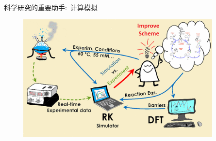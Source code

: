 \small
\begin{frame}{科学研究的重要助手:~计算模拟}
\begin{figure}[h!]
\vspace*{-0.18in}
\centering
\includegraphics[height=2.55in,width=4.05in]{Figures/Schematic_Material-Design.png}
\label{Schematic_Material-Design}
\end{figure}
\end{frame}

